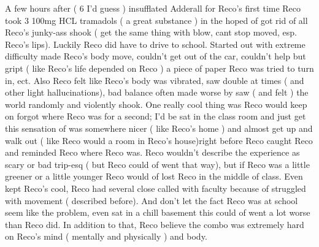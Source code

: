 \documentclass[12pt]{book}
\begin{document}
A few hours after ( 6 I'd guess ) insufflated Adderall for Reco's first time Reco took 3 100mg HCL tramadols ( a great substance ) in the hoped of got rid of all Reco's junky-ass shook ( get the same thing with blow, cant stop moved, esp. Reco's lips). Luckily Reco did have to drive to school. Started out with extreme difficulty made Reco's body move, couldn't get out of the car, couldn't help but gript ( like Reco's life depended on Reco ) a piece of paper Reco was tried to turn in, ect. Also Reco felt like Reco's body was vibrated, saw double at times ( and other light hallucinations), bad balance often made worse by saw ( and felt ) the world randomly and violently shook. One really cool thing was Reco would keep on forgot where Reco was for a second; I'd be sat in the class room and just get this sensation of was somewhere nicer ( like Reco's home ) and almost get up and walk out ( like Reco would a room in Reco's house)right before Reco caught Reco and reminded Reco where Reco was. Reco wouldn't describe the experience as scary or bad trip-esq ( but Reco could of went that way), but if Reco was a little greener or a little younger Reco would of lost Reco in the middle of class. Even kept Reco's cool, Reco had several close called with faculty because of struggled with movement ( described before). And don't let the fact Reco was at school seem like the problem, even sat in a chill basement this could of went a lot worse than Reco did. In addition to that, Reco believe the combo was extremely hard on Reco's mind ( mentally and physically ) and body.
\end{document}
